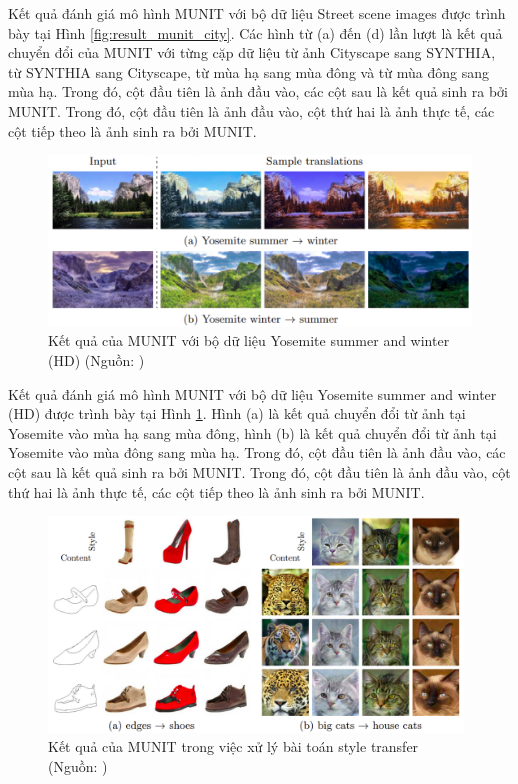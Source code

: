{     \noindent Kết quả đánh giá mô hình MUNIT với bộ dữ liệu Street scene images được trình bày tại Hình \ref{fig:result_munit_city}. Các hình từ (a) đến (d) lần lượt là kết quả chuyển đổi của MUNIT với từng cặp dữ liệu từ ảnh Cityscape sang SYNTHIA, từ SYNTHIA sang Cityscape, từ mùa hạ sang mùa đông và từ mùa đông sang mùa hạ. Trong đó, cột đầu tiên là ảnh đầu vào, các cột sau là kết quả sinh ra bởi MUNIT. Trong đó, cột đầu tiên là ảnh đầu vào, cột thứ hai là ảnh thực tế, các cột tiếp theo là ảnh sinh ra bởi MUNIT.

    \begin{figure}[H]
    \centering
    \includegraphics[width=13cm] {images/result_munit_yosemite.png}
    \caption{Kết quả của MUNIT với bộ dữ liệu Yosemite summer and winter (HD) (Nguồn: \cite{munit})}
    \label{fig:result_munit_yosemite}
    \end{figure}
    
     \noindent Kết quả đánh giá mô hình MUNIT với bộ dữ liệu Yosemite summer and winter (HD) được trình bày tại Hình \ref{fig:result_munit_yosemite}. Hình (a) là kết quả chuyển đổi từ ảnh tại Yosemite vào mùa hạ sang mùa đông, hình (b) là kết quả chuyển đổi từ ảnh tại Yosemite vào mùa đông sang mùa hạ. Trong đó, cột đầu tiên là ảnh đầu vào, các cột sau là kết quả sinh ra bởi MUNIT. Trong đó, cột đầu tiên là ảnh đầu vào, cột thứ hai là ảnh thực tế, các cột tiếp theo là ảnh sinh ra bởi MUNIT.

    \begin{figure}[H]
    \centering
    \includegraphics[width=11cm] {images/result_munit_style_transfer.png}
    \caption{Kết quả của MUNIT trong việc xử lý bài toán style transfer (Nguồn: \cite{munit})}
    \label{fig:result_munit_style_transfer}
    \end{figure}
    
}
